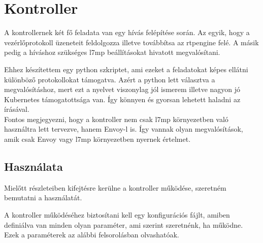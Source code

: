 \chapter{Kontroller}

A kontrollernek két fő feladata van egy hívás felépítése során. Az egyik, hogy
a vezérlőprotokoll üzeneteit feldolgozza illetve továbbítsa az rtpengine
felé. A másik pedig a híváshoz szükséges l7mp beállításokat hivatott 
megvalósítani.

Ehhez készítettem egy python szkriptet, ami ezeket a feladatokat képes ellátni
különböző protokollokat támogatva. Azért a python lett választva a megvalósításhoz,
mert ezt a nyelvet viszonylag jól ismerem illetve nagyon jó Kubernetes 
támogatottsága van. Így könnyen és gyorsan lehetett haladni az írásával. \\

Fontos megjegyezni, hogy a kontroller nem csak l7mp környezetben való használtra lett
tervezve, hanem Envoy-l is. Így vannak olyan megvalósítások, amik csak Envoy
vagy l7mp környezetben nyernek értelmet. 

\section{Használata}

Mielőtt részleteiben kifejtésre kerülne a kontroller működése, szeretném bemutatni a
használatát.

A kontroller működéséhez biztosítani kell egy konfigurációs fájlt, amiben definiálva
van minden olyan paraméter, ami szerint szeretnénk, ha működne. Ezek a paraméterek
az alábbi felsorolásban olvashatóak.

